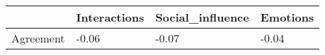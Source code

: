 \begin{tabular}{llll}
\toprule
{} & Interactions & Social\_influence & Emotions \\
\midrule
Agreement &        -0.06 &            -0.07 &    -0.04 \\
\bottomrule
\end{tabular}
